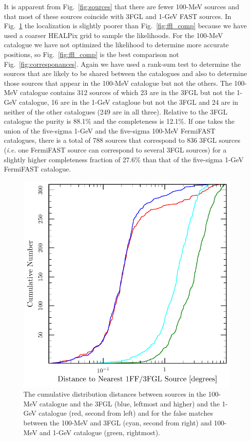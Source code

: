 \documentclass[useAMS,usenatbib]{mn2e}
\begin{document}
It is apparent from Fig.~\ref{fig:sources} that there are fewer
100-MeV sources and that most of these sources coincide with 3FGL and
1-GeV FAST sources.  In Fig.~\ref{fig:cum0.1GeV} the localization is
slightly poorer than Fig.~\ref{fig:ffl_comp} because we have used a
coarser HEALPix grid to sample the likelihoods. For the 100-MeV
catalogue we have not optimized the likelihood to determine more
accurate positions, so Fig.~\ref{fig:ffl_comp} is the best comparison
not Fig.~\ref{fig:corresponances}.  Again we have used a rank-sum test
to determine the sources that are likely to be shared between the
catalogues and also to determine those sources that appear in the
100-MeV catalogue but not the others.  The 100-MeV catalogue contains
312 sources of which 23 are in the 3FGL but not the 1-GeV catalogue,
16 are in the 1-GeV catagloue but not the 3FGL and 24 are in neither
of the other catalogues (249 are in all three). Relative to the 3FGL catalogue
the purity is 88.1\% and the completeness is 12.1\%. If one takes the
union of the five-sigma 1-GeV and the five-sigma 100-MeV FermiFAST
catalogues, there is a total of 788 sources that correspond to 836
3FGL sources ({\em i.e.} one FermiFAST source can correspond to
several 3FGL sources) for a slightly higher completeness fraction of
27.6\% than that of the five-sigma 1-GeV FermiFAST catalogue.

\begin{figure}
  \includegraphics[width=\columnwidth]{cum0p1GeV}
  \caption{The cumulative distribution distances between sources in
    the 100-MeV catalogue and the 3FGL (blue, leftmost and higher) and
    the 1-GeV catalogue (red, second from left) and for the false
    matches between the 100-MeV and 3FGL (cyan, second from right) and
    100-MeV and 1-GeV catalogue (green, rightmost).}
  \label{fig:cum0.1GeV}
\end{figure}
\end{document}
